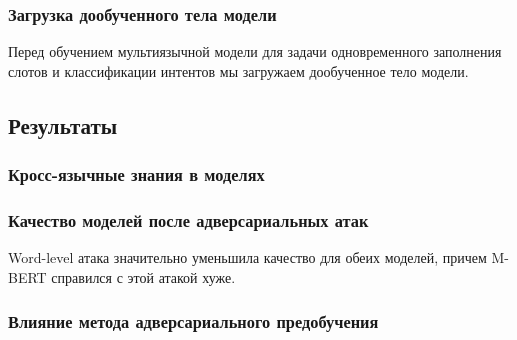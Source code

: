 
\subsubsection{Загрузка дообученного тела модели}
Перед обучением мультиязычной модели для задачи одновременного заполнения слотов и классификации интентов мы загружаем дообученное тело модели.

\subsection{Результаты}


\subsubsection{Кросс-язычные знания в моделях}




\subsubsection{Качество моделей после адверсариальных атак}




Word-level атака значительно уменьшила качество для обеих моделей, причем M-BERT справился с этой атакой хуже.

\subsubsection{Влияние метода адверсариального предобучения}
